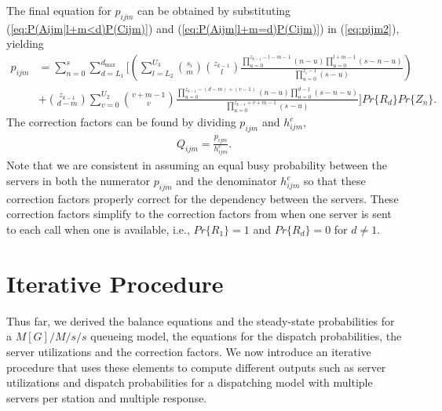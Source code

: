 \documentclass[11pt]{article}\topmargin 0mm
\begin{document}
The final equation for $p_{ijm}$ can be obtained by
substituting (\ref{eq:P(Aijm|l+m<d)P(Cijm)}) and
(\ref{eq:P(Aijm|l+m=d)P(Cijm)}) in (\ref{eq:pijm2}), yielding
\begin{equation}
\label{eq:pijm3}
\begin{split}
p_{ijm} & = \sum_{n=0}^s \sum_{d=L_1}^{d_{\max}} \Biggl[ \left(\sum_{l=L_2}^{U_3} {s_i \choose m}{z_{k-1} \choose l} \frac{\prod_{u=0}^{z_{k-1}-l-m-1}(n-u)\prod_{u=0}^{l+m-1}(s-n-u)}{\prod_{u=0}^{z_i-1}(s-u)} \right) \\
& + {z_{k-1} \choose d-m} \sum_{v=0}^{U_2} {v+m-1 \choose v} \frac{\prod_{u=0}^{z_{k-1}-(d-m)+(v-1)}(n-u)\prod_{u=0}^{d-1}(s-n-u)}{\prod_{u=0}^{z_{k-1}+v+m-1}(s-u)} \Biggr]Pr\{R_d\} Pr\{Z_n\}.
\end{split}
\end{equation}
The correction factors can be found by dividing $p_{ijm}$ and
$h_{ijm}^c$,
\begin{equation}
\label{eq:Qijm}
\begin{split}
Q_{ijm} = \frac{p_{ijm}}{h_{ijm}^c}.
\end{split}
\end{equation}
Note that we are consistent in assuming an equal busy
probability between the servers in both the numerator $p_{ijm}$
and the denominator $h^c_{ijm}$ so that these correction
factors properly correct for the dependency between the
servers. %
These correction factors simplify to the
correction factors from \citet{Budge-etal-09} when one server is
sent to each call when one is available, i.e., $Pr\{R_1\}=1$
and $Pr\{R_d\}=0$ for $d\neq1$.


\section{Iterative Procedure}
\label{sec:iterative_procedure} Thus far, we derived the
balance equations and the steady-state probabilities for a
$M[G]/M/s/s$ queueing model, the equations for the dispatch
probabilities, the server utilizations and the correction
factors. We now introduce an iterative procedure that uses
these elements to compute different outputs such as server
utilizations and dispatch probabilities for a dispatching model
with multiple servers per station and multiple response.

\end{document}
